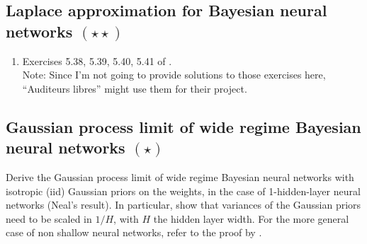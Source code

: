 \documentclass{article}
\begin{document}
\subsection{Laplace approximation for Bayesian neural networks $(\star\star)$}
\begin{enumerate}
\item Exercises 5.38, 5.39, 5.40, 5.41 
of \cite{Bis06}.\\
Note: Since I'm not going to provide solutions to those exercises here, ``Auditeurs libres'' might use them for their project.
\end{enumerate}

\subsection{Gaussian process limit of wide regime Bayesian neural networks $(\star)$}
Derive the Gaussian process limit of wide regime Bayesian neural networks with isotropic (iid) Gaussian priors on the weights, in the case of 1-hidden-layer neural networks (Neal's result). In particular, show that variances of the Gaussian priors need to be scaled in $1/H$, with $H$ the hidden layer width. For the more general case of non shallow neural networks, refer to the proof by \cite{matthews2018gaussian}.


\printbibliography
\end{document}
